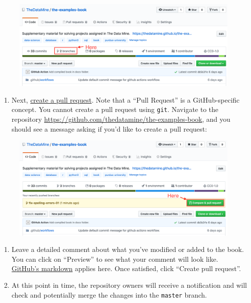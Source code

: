 \documentclass[]{book}
\providecommand{\tightlist}{%
  \setlength{\itemsep}{0pt}\setlength{\parskip}{0pt}}
\begin{document}
\begin{figure}
\centering
\includegraphics{./images/gh-desktop-14.png}
\caption{}
\end{figure}

\begin{enumerate}
\def\labelenumi{\arabic{enumi}.}
\setcounter{enumi}{18}
\tightlist
\item
  Next, \href{}{create a pull request}. Note that a ``Pull Request'' is
  a GitHub-specific concept. You cannot create a pull request using
  \texttt{git}. Navigate to the repository
  \url{https://github.com/thedatamine/the-examples-book}, and you should
  see a message asking if you'd like to create a pull request:
\end{enumerate}

\begin{figure}
\centering
\includegraphics{./images/pr-01.png}
\caption{}
\end{figure}

\begin{enumerate}
\def\labelenumi{\arabic{enumi}.}
\setcounter{enumi}{19}
\item
  Leave a detailed comment about what you've modified or added to the
  book. You can click on ``Preview'' to see what your comment will look
  like.
  \href{https://help.github.com/en/github/writing-on-github/basic-writing-and-formatting-syntax}{GitHub's
  markdown} applies here. Once satisfied, click ``Create pull request''.
\item
  At this point in time, the repository owners will receive a
  notification and will check and potentially merge the changes into the
  \texttt{master} branch.
\end{enumerate}
\end{document}
